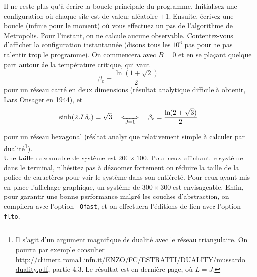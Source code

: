 \documentclass{book}
\newcommand{\inline}[1]{\texttt{#1}}
\begin{document}
Il ne reste plus qu'à écrire la boucle principale du programme. Initialisez une configuration où chaque site est de valeur aléatoire $\pm 1$. Ensuite, écrivez une boucle (infinie pour le moment) où vous effectuez un pas de l'algorithme de Metropolis. Pour l'instant, on ne calcule aucune observable. Contentez-vous d'afficher la configuration instantannée (disons tous les $10^6$ pas pour ne pas ralentir trop le programme). On commencera avec $B=0$ et en se plaçant quelque part autour de la température critique, qui vaut
\begin{equation}
\beta_\text{c} = \frac{\ln(1+\sqrt{2})}{2}
\end{equation}
pour un réseau carré en deux dimensions (résultat analytique difficile à obtenir, Lars Onsager en 1944), et
\begin{equation}
\sinh(2\,J\,\beta_\text{c})=\sqrt{3} \quad \xLeftrightarrow[J=1]{} \quad \beta_\text{c} = \frac{\ln(2+\sqrt{3})}{2}
\end{equation}

 pour un réseau hexagonal (résltat analytique relativement simple à calculer par dualité\footnote{Il s'agit d'un argument magnifique de dualité avec le réseau triangulaire. On pourra par exemple consulter \url{http://chimera.roma1.infn.it/ENZO/FC/ESTRATTI/DUALITY/mussardo_duality.pdf}, partie 4.3. Le résultat est en dernière page, où $L=J$.}).\\

 Une taille raisonnable de système est $200 \times 100$. Pour ceux affichant le système dans le terminal, n'hésitez pas à dézoomer fortement ou réduire la taille de la police de caractères pour voir le système dans son entièreté. Pour ceux ayant mis en place l'affichage graphique, un système de $300 \times 300$ est envisageable. Enfin, pour garantir une bonne performance malgré les couches d'abstraction, on compilera avec l'option \inline{-Ofast}, et on effectuera l'éditions de lien avec l'option \inline{-flto}.\\
\end{document}
